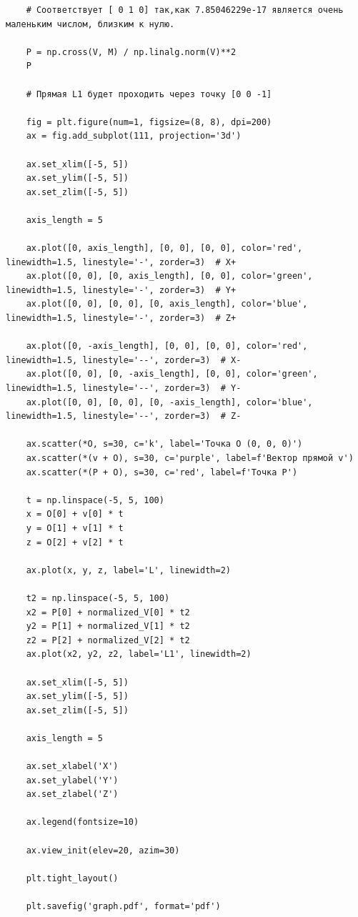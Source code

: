 \begin{verbatim}
    # Соответствует [ 0 1 0] так,как 7.85046229e-17 является очень маленьким числом, близким к нулю.

    P = np.cross(V, M) / np.linalg.norm(V)**2
    P

    # Прямая L1 будет проходить через точку [0 0 -1]

    fig = plt.figure(num=1, figsize=(8, 8), dpi=200)
    ax = fig.add_subplot(111, projection='3d')

    ax.set_xlim([-5, 5])
    ax.set_ylim([-5, 5])
    ax.set_zlim([-5, 5])

    axis_length = 5

    ax.plot([0, axis_length], [0, 0], [0, 0], color='red', linewidth=1.5, linestyle='-', zorder=3)  # X+
    ax.plot([0, 0], [0, axis_length], [0, 0], color='green', linewidth=1.5, linestyle='-', zorder=3)  # Y+
    ax.plot([0, 0], [0, 0], [0, axis_length], color='blue', linewidth=1.5, linestyle='-', zorder=3)  # Z+

    ax.plot([0, -axis_length], [0, 0], [0, 0], color='red', linewidth=1.5, linestyle='--', zorder=3)  # X-
    ax.plot([0, 0], [0, -axis_length], [0, 0], color='green', linewidth=1.5, linestyle='--', zorder=3)  # Y-
    ax.plot([0, 0], [0, 0], [0, -axis_length], color='blue', linewidth=1.5, linestyle='--', zorder=3)  # Z-

    ax.scatter(*O, s=30, c='k', label='Точка O (0, 0, 0)')
    ax.scatter(*(v + O), s=30, c='purple', label=f'Вектор прямой v')
    ax.scatter(*(P + O), s=30, c='red', label=f'Точка P')

    t = np.linspace(-5, 5, 100)
    x = O[0] + v[0] * t
    y = O[1] + v[1] * t
    z = O[2] + v[2] * t

    ax.plot(x, y, z, label='L', linewidth=2)

    t2 = np.linspace(-5, 5, 100)
    x2 = P[0] + normalized_V[0] * t2
    y2 = P[1] + normalized_V[1] * t2
    z2 = P[2] + normalized_V[2] * t2
    ax.plot(x2, y2, z2, label='L1', linewidth=2)

    ax.set_xlim([-5, 5])
    ax.set_ylim([-5, 5])
    ax.set_zlim([-5, 5])

    axis_length = 5

    ax.set_xlabel('X')
    ax.set_ylabel('Y')
    ax.set_zlabel('Z')

    ax.legend(fontsize=10)

    ax.view_init(elev=20, azim=30)

    plt.tight_layout()

    plt.savefig('graph.pdf', format='pdf')


\end{verbatim}
